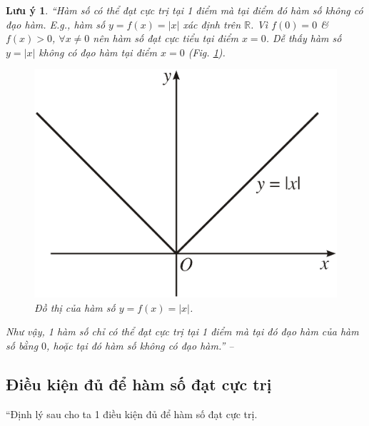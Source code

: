 \documentclass[oneside]{book}
\numberwithin{equation}{section}
\newtheorem{luuy}{Lưu ý}[section]
\begin{document}
\begin{luuy}
	``Hàm số có thể đạt cực trị tại 1 điểm mà tại điểm đó hàm số không có đạo hàm. E.g., hàm số $y = f(x) = |x|$ xác định trên $\mathbb{R}$. Vì $f(0) = 0$ \& $f(x) > 0$, $\forall x\ne 0$ nên hàm số đạt cực tiểu tại điểm $x = 0$. Dễ thấy hàm số $y = |x|$ không có đạo hàm tại điểm $x = 0$ (Fig. \ref{fig:graph_abs}).
	
	\begin{figure}[H]
		\centering
		\includegraphics[scale=0.15]{graph_abs}
		\caption{Đồ thị của hàm số $y = f(x) = |x|$.}
		\label{fig:graph_abs}
	\end{figure}
	Như vậy, 1 hàm số chỉ có thể đạt cực trị tại 1 điểm mà tại đó đạo hàm của hàm số bằng $0$, hoặc tại đó hàm số không có đạo hàm.'' -- \cite[p. 11]{SGK_Toan_12_giai_tich_nang_cao}
\end{luuy}

\subsection{Điều kiện đủ để hàm số đạt cực trị}
``Định lý sau cho ta 1 điều kiện đủ để hàm số đạt cực trị.
\end{document}
